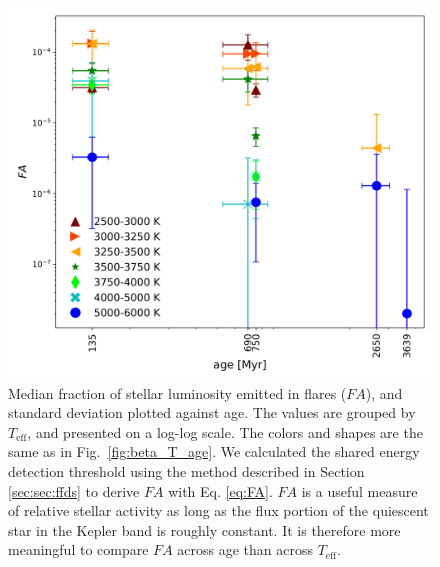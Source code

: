 \documentclass{aa}
\begin{document}
\begin{figure}[ht!]
    \centering
    \includegraphics[width=\hsize]{pics/FA/FA_T_age_Ethresh.png}
    \caption{Median fraction of stellar luminosity emitted in flares ($FA$), and standard deviation plotted against age. The values are grouped by $T_\mathrm{eff}$, and presented on a log-log scale. The colors and shapes are the same as in Fig.~\ref{fig:beta_T_age}. We calculated the shared energy detection threshold \unskip\;using the method described in Section \ref{sec:sec:ffds} to derive $FA$ with Eq. \ref{eq:FA}. $FA$ is a useful measure of relative stellar activity as long as the flux portion of the quiescent star in the Kepler band is roughly constant. It is therefore more meaningful to compare $FA$ across age than across $T_\mathrm{eff}$.}   
    \label{fig:FA}
\end{figure}
\end{document}
